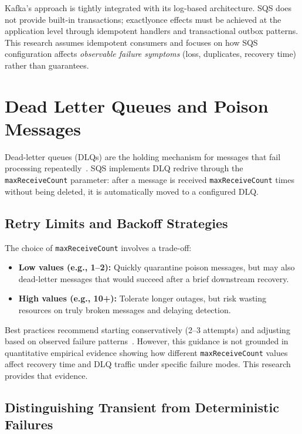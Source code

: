 Kafka's approach is tightly integrated with its log-based architecture. SQS does not provide built-in transactions; exactlyonce effects must be achieved at the application level through idempotent handlers and transactional outbox patterns. This research assumes idempotent consumers and focuses on how SQS configuration affects \emph{observable failure symptoms} (loss, duplicates, recovery time) rather than guarantees.

\section{Dead Letter Queues and Poison Messages}

Dead-letter queues (DLQs) are the holding mechanism for messages that fail processing repeatedly~\citep{AWSSQSGuide}. SQS implements DLQ redrive through the \texttt{maxReceiveCount} parameter: after a message is received \texttt{maxReceiveCount} times without being deleted, it is automatically moved to a configured DLQ.

\subsection{Retry Limits and Backoff Strategies}

The choice of \texttt{maxReceiveCount} involves a trade-off:
\begin{itemize}
    \item \textbf{Low values (e.g., 1–2):} Quickly quarantine poison messages, but may also dead-letter messages that would succeed after a brief downstream recovery.
    \item \textbf{High values (e.g., 10+):} Tolerate longer outages, but risk wasting resources on truly broken messages and delaying detection.
\end{itemize}

Best practices recommend starting conservatively (2–3 attempts) and adjusting based on observed failure patterns~\citep{AWSResilience2023}. However, this guidance is not grounded in quantitative empirical evidence showing how different \texttt{maxReceiveCount} values affect recovery time and DLQ traffic under specific failure modes. This research provides that evidence.

\subsection{Distinguishing Transient from Deterministic Failures}

